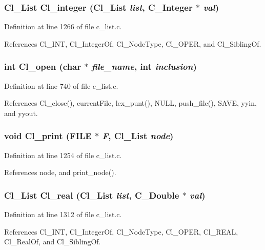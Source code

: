 \subsubsection{\setlength{\rightskip}{0pt plus 5cm}\bf{Cl\_\-List} Cl\_\-integer (\bf{Cl\_\-List} {\em list}, \bf{C\_\-Integer} $\ast$ {\em val})}\label{c__list_8c_7c11ba87e404bd4c849029d4fab90c8a}




Definition at line 1266 of file c\_\-list.c.

References Cl\_\-INT, Cl\_\-Integer\-Of, Cl\_\-Node\-Type, Cl\_\-OPER, and Cl\_\-Sibling\-Of.
\subsubsection{\setlength{\rightskip}{0pt plus 5cm}int Cl\_\-open (char $\ast$ {\em file\_\-name}, int {\em inclusion})}\label{c__list_8c_c5c20eb36123e901c07727a1b6a1e6dd}




Definition at line 740 of file c\_\-list.c.

References Cl\_\-close(), current\-File, lex\_\-punt(), NULL, push\_\-file(), SAVE, yyin, and yyout.
\subsubsection{\setlength{\rightskip}{0pt plus 5cm}void Cl\_\-print (FILE $\ast$ {\em F}, \bf{Cl\_\-List} {\em node})}\label{c__list_8c_1a08bd2e228bd74aa950036ffefbbc3d}




Definition at line 1254 of file c\_\-list.c.

References node, and print\_\-node().
\subsubsection{\setlength{\rightskip}{0pt plus 5cm}\bf{Cl\_\-List} Cl\_\-real (\bf{Cl\_\-List} {\em list}, \bf{C\_\-Double} $\ast$ {\em val})}\label{c__list_8c_82c85c1fbf57c6bbe31a4022fcd9da92}




Definition at line 1312 of file c\_\-list.c.

References Cl\_\-INT, Cl\_\-Integer\-Of, Cl\_\-Node\-Type, Cl\_\-OPER, Cl\_\-REAL, Cl\_\-Real\-Of, and Cl\_\-Sibling\-Of.
